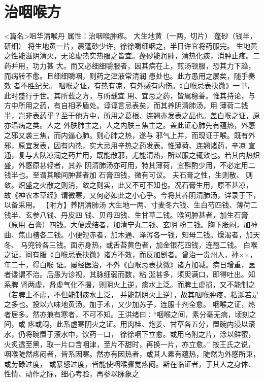 \documentclass[a4paper,12pt,UTF8,twoside]{ctexbook}
\begin{document}
\chapter{治咽喉方}
<篇名>咀华清喉丹
属性：治咽喉肿疼。 
大生地黄（一两，切片） 蓬砂（钱半，研细） 
将生地黄一片，裹蓬砂少许，徐徐嚼细咽之，半日许宜将药服完。 
生地黄之性能滋阴清火，无论虚热实热服之皆宜。蓬砂能润肺，清热化痰，消肿止疼。二药并用，功力甚 
大。而又必细细嚼服者，因其病在上，煎汤顿服，恐其力下趋，而病转不愈。且细细嚼咽，则药之津液常清润 
患处也。此方愚用之屡矣，随手奏效 
者不胜纪矣。 
咽喉之证，有热有凉，有外感有内伤。《白喉忌表抉微》一书，此时盛行于世。其所载之方，与所载宜 
用、宜忌之药，皆属稳善。惟其持论，与方中所用之药，有自相矛盾处。谆谆言忌表矣，而其养阴清肺汤，用 
薄荷二钱半，岂非表药乎？至于他方中，所用之葛根、连翘亦发表之品也。盖白喉之证，原亦温病之类。人之 
外肤肺主之，人之内肤三焦主之。盖此证心肺先有蕴热，外感之邪又袭三焦，而内逼心肺。则心肺之热，遂与 
邪气上并，而现证于喉。既有外邪，原宜发表，因有内热，实大忌用辛热之药发表。惟薄荷、连翘诸药，辛凉 
宣通，复与大队凉润之药并用，既能散邪，尤能清热，所以服之辄效也。若其内热炽盛，外感原甚轻者，其养 
阴清肺汤亦可用，特其薄荷，宜斟酌少用，不必定用二钱半也。至谓其喉间肿甚者加 石膏四钱，微有可议。 
夫石膏之性，生则散、 则敛。炽盛之火散之则消，敛之则实，此又不可不知也。况石膏生用，原不甚凉， 
故《神农本草经》谓微寒，又何必如此之小心乎。今将其养阴清肺汤，详录于下，以备采用。 
【附方】养阴清肺汤 大生地一两、寸麦冬六钱、生白芍四钱、薄荷二钱半、玄参八钱、丹皮四 
钱、贝母四钱、生甘草二钱。喉间肿甚者，加生石膏（原用 石膏）四钱。大便燥结者，加清宁丸二钱、玄明 
粉二钱。胸下胀闷，加神曲、焦山楂各二钱。小便短赤者，加木通、泽泻各一钱，知母二钱。燥渴者，加天冬、 
马兜铃各三钱。面赤身热，或舌苔黄色者，加金银花四钱，连翘二钱。 
白喉之证，间有服《白喉忌表抉微》诸方不效，而反加剧者。曾治一贵州人，孙××，年二十，得白喉 
证。屡经医治，不外《白喉忌表抉微》诸方加减。病日增重，医者诿谓不治。后愚为诊视，其脉细弱而数，粘 
涎甚多，须臾满口，即得吐出。知系脾 
肾两虚，肾虚气化不摄，则阴火上逆，痰水上泛。而脾土虚损，又不能制之（若脾土不虚，不但能制痰水上泛， 
并能制阴火上逆），故其咽喉肿疼，粘涎若是之多也。投以六味地黄汤，加于术，又少加苏子，连服十剂全愈。 
咽喉之证，热者居多。然亦兼有寒者，不可不知。王洪绪曰∶“咽喉之间，素分毫无病，顷刻之间，或 
疼或闷，此系虚寒阴火之证。用肉桂、炮姜、甘草各五分，置碗内浸以滚水，仍将碗置于滚水中，饮药一口， 
徐徐咽下立愈。或用乌附之片，涂以鲜蜜，火炙透至黑，取一片口含咽津，至片不甜时，再换一片，亦立愈。” 
按王氏之说，咽喉陡然疼闷者，皆系因寒。然亦有因热者，或其人素有蕴热，陡然为外感所束，或劳碌过度， 
或暴怒过度，皆能使咽喉骤觉疼闷。斯在临证者，于其人之身体、性情、动作之际，细心考验，再参以脉象之 
\end{document}
